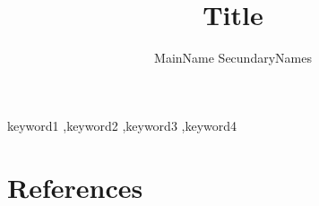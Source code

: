 










\begin{frontmatter}

\title{Title}


\author[feup-address]{MainName SecundaryNames }

\address[feup-address]{Address}





\begin{keyword}
	keyword1 \sep keyword2 \sep keyword3 \sep keyword4
\end{keyword}

\end{frontmatter}














\section*{References}






